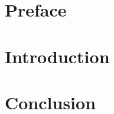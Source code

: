 







\section*{Preface}

\newpage


\tableofcontents

\section*{Introduction}







\section{Conclusion}

